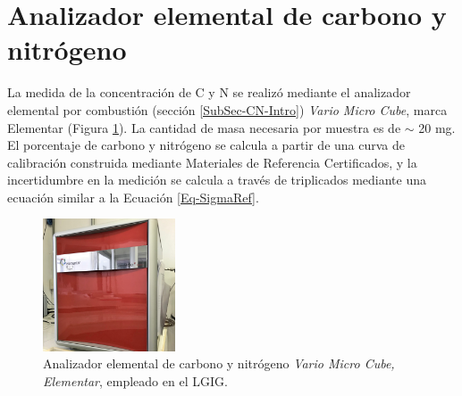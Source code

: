 	\section{Analizador elemental de carbono y nitrógeno}\label{Secc-CN}
La medida de la concentración de C y N se realizó mediante el analizador elemental por combustión (sección \ref{SubSec-CN-Intro}) \textit{Vario Micro Cube}, marca Elementar (Figura \ref{Fig-Elementar}). La cantidad de masa necesaria por muestra es de $\sim$ 20 mg. El porcentaje de carbono y nitrógeno se calcula a partir de una curva de calibración construida mediante Materiales de Referencia Certificados, y la incertidumbre en la medición se calcula a través de triplicados mediante una ecuación similar a la Ecuación \ref{Eq-SigmaRef}.
\begin{figure}[h]
\centering
\includegraphics[width=0.35\textwidth]{Imagenes/Elementar.jpg}
\caption{Analizador elemental de carbono y nitrógeno \textit{Vario Micro Cube, Elementar}, empleado en el LGIG.}\label{Fig-Elementar}
\end{figure}
